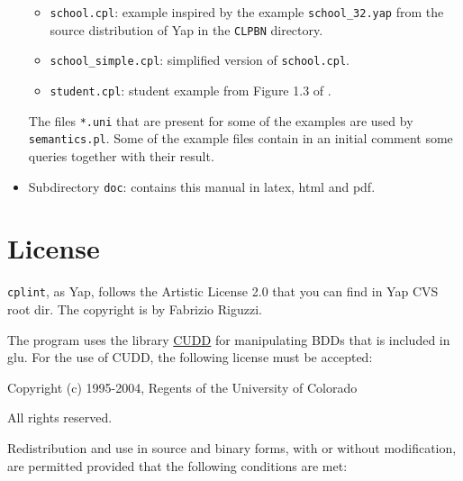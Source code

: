 \documentclass[a4paper,12pt]{article}
\begin{document}
\begin{itemize}
\begin{itemize}
\item \texttt{school.cpl}: example inspired by the example \verb|school_32.yap| from the 
source distribution of Yap in the \texttt{CLPBN} directory.
\item \verb|school_simple.cpl|: simplified version of \texttt{school.cpl}.
\item \verb|student.cpl|: student example from Figure 1.3 of \cite{GetFri01-BC}.
\end{itemize}
The files \texttt{*.uni} that are present for some of the examples are used  by \texttt{semantics.pl}. Some of the example files contain in an initial comment some queries together with their result.
\item Subdirectory \texttt{doc}: contains this manual in latex, html and pdf.
\end{itemize}
\section{License}
\label{license}



\texttt{cplint}, as Yap, follows the Artistic License 2.0 that you can find in Yap CVS root dir. The copyright is by Fabrizio Riguzzi.


\vspace{3mm}

The program uses the library \href{http://vlsi.colorado.edu/\%7Efabio/}{CUDD} for manipulating BDDs that is included in glu.
For the use of CUDD, the following license must be accepted:

\vspace{3mm}

Copyright (c) 1995-2004, Regents of the University of Colorado

All rights reserved.

Redistribution and use in source and binary forms, with or without
modification, are permitted provided that the following conditions
are met:
\end{document}
